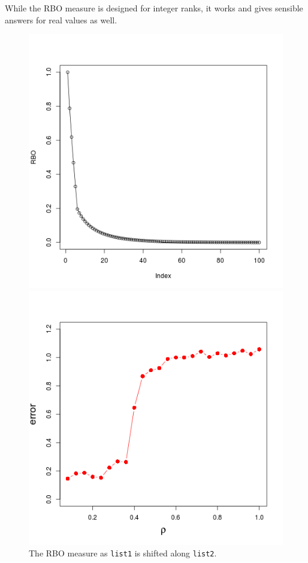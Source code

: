 \documentclass[11pt]{article}
\begin{document}
While the RBO measure is designed for integer ranks, it works and gives sensible answers for real values as well.






\begin{figure}[ht]
  \begin{minipage}[t]{0.5\linewidth}
    \centering
    \includegraphics[width=0.8\linewidth]{./figs/shift_variables.png}
    \caption{The RBO measure as \texttt{list1} is shifted along \texttt{list2}.}
    \label{figure:shift_variables.png}
    \vspace{4ex}
  \end{minipage}%
\hspace{4ex}
  \begin{minipage}[t]{0.5\linewidth}
    \centering
    \includegraphics[width=0.8\linewidth]{./figs/transect.png}

\end{minipage}
\end{figure}
\end{document}
